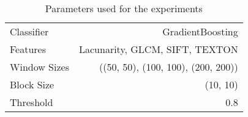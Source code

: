 
\begin{table}
	\centering
	\begin{tabular}{lr}
		\hline
		Classifier & GradientBoosting\\
		Features & Lacunarity, GLCM, SIFT, TEXTON\\
		Window Sizes & ((50, 50), (100, 100), (200, 200))\\
		Block Size & (10, 10)\\
		Threshold & 0.8\\
		\hline
	\end{tabular}
	\label{fig:params}
	\caption{Parameters used for the experiments}
\end{table}

